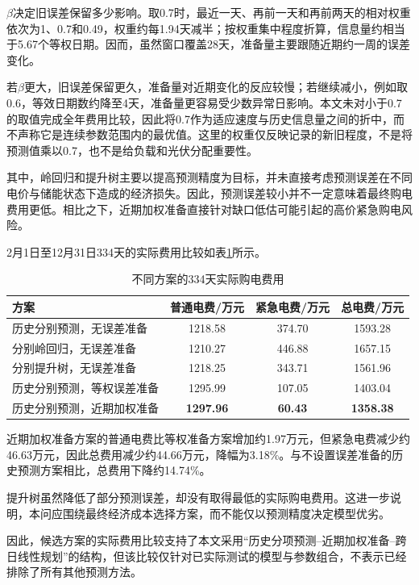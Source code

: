 $\beta$决定旧误差保留多少影响。取0.7时，最近一天、再前一天和再前两天的相对权重依次为1、0.7和0.49，权重约每1.94天减半；按权重集中程度折算，信息量约相当于5.67个等权日期。因而，虽然窗口覆盖28天，准备量主要跟随近期约一周的误差变化。

若$\beta$更大，旧误差保留更久，准备量对近期变化的反应较慢；若继续减小，例如取0.6，等效日期数约降至4天，准备量更容易受少数异常日影响。本文未对小于0.7的取值完成全年费用比较，因此将0.7作为适应速度与历史信息量之间的折中，而不声称它是连续参数范围内的最优值。这里的权重仅反映记录的新旧程度，不是将预测值乘以0.7，也不是给负载和光伏分配重要性。

其中，岭回归和提升树主要以提高预测精度为目标，并未直接考虑预测误差在不同电价与储能状态下造成的经济损失。因此，预测误差较小并不一定意味着最终购电费用更低。相比之下，近期加权准备直接针对缺口低估可能引起的高价紧急购电风险。

2月1日至12月31日334天的实际费用比较如表\ref{tab:q2_model_compare}所示。

\begin{table}[htbp]
\centering
\caption{不同方案的334天实际购电费用}
\label{tab:q2_model_compare}
\begin{tabular}{lccc}
\hline
方案 & 普通电费/万元 & 紧急电费/万元 & 总电费/万元 \\
\hline
历史分别预测，无误差准备
& 1218.58 & 374.70 & 1593.28 \\
分别岭回归，无误差准备
& 1210.27 & 446.88 & 1657.15 \\
分别提升树，无误差准备
& 1218.25 & 343.71 & 1561.96 \\
历史分别预测，等权误差准备
& 1295.99 & 107.05 & 1403.04 \\
历史分别预测，近期加权准备
& \textbf{1297.96} & \textbf{60.43} & \textbf{1358.38} \\
\hline
\end{tabular}
\end{table}

近期加权准备方案的普通电费比等权准备方案增加约1.97万元，但紧急电费减少约46.63万元，因此总费用减少约44.66万元，降幅为3.18\%。与不设置误差准备的历史预测方案相比，总费用下降约14.74\%。

提升树虽然降低了部分预测误差，却没有取得最低的实际购电费用。这进一步说明，本问应围绕最终经济成本选择方案，而不能仅以预测精度决定模型优劣。

因此，候选方案的实际费用比较支持了本文采用“历史分项预测--近期加权准备--跨日线性规划”的结构，但该比较仅针对已实际测试的模型与参数组合，不表示已经排除了所有其他预测方法。


